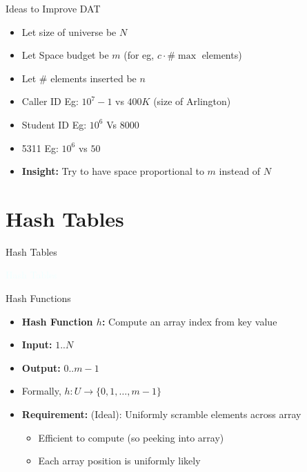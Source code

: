 \documentclass{beamer}
\newcommand{\thblue}[1]{{\Huge {\textcolor{azure}{#1}}}}
\begin{document}
\begin{frame}{Ideas to Improve DAT}
    \begin{itemize}
        \item Let size of universe be $N$
        \item Let Space budget be $m$ (for eg, $c \cdot \#\max$ elements)\pause
        \item Let \# elements inserted be $n$ 
        \item Caller ID Eg: $10^7-1$ vs $400K$ (size of Arlington)
        \item Student ID Eg: $10^6$ Vs $8000$ 
        \item 5311 Eg: $10^6$ vs $50$ \pause
        \item {\bf Insight:} Try to have space proportional to $m$ instead of $N$
    \end{itemize}
\end{frame}


\section{Hash Tables}

\begin{frame}{Hash Tables}
    \begin{center}
        \thblue{Hash Tables}
    \end{center}
\end{frame}

\begin{frame}{Hash Functions}
    \begin{itemize}
        \item {\bf Hash Function $h$:} Compute an array index from key value
        \item {\bf Input:} $1 .. N$
        \item {\bf Output:} $0 .. m-1$ 
        \item Formally, $h : U \rightarrow \{0, 1, \ldots, m-1\}$
        \item {\bf Requirement:} (Ideal): Uniformly scramble elements across array
        \begin{itemize}
            \item Efficient to compute (so peeking into array)
            \item Each array position is uniformly likely
        \end{itemize}
    \end{itemize}
\end{frame}
\end{document}
